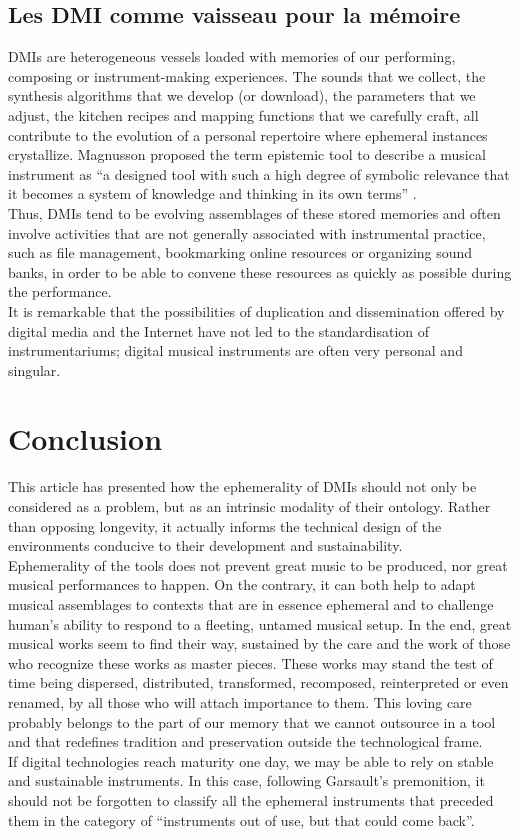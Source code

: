 \subsection{Les DMI comme vaisseau pour la mémoire}
DMIs are heterogeneous vessels loaded with memories of our performing, composing or instrument-making experiences. The sounds that we collect, the synthesis algorithms that we develop (or download), the parameters that we adjust, the kitchen recipes and mapping functions that we carefully craft, all contribute to the evolution of a personal repertoire where ephemeral instances crystallize. Magnusson proposed the term epistemic tool to describe a musical instrument as “a designed tool with such a high degree of symbolic relevance that it becomes a system of knowledge and thinking in its own terms” \cite{magnusson_epistemic_2009}.\\
\indent Thus, DMIs tend to be evolving assemblages of these stored memories and often involve activities that are not generally associated with instrumental practice, such as file management, bookmarking online resources or organizing sound banks, in order to be able to convene these resources as quickly as possible during the performance.\\
\indent It is remarkable that the possibilities of duplication and dissemination offered by digital media and the Internet have not led to the standardisation of instrumentariums; digital musical instruments are often very personal and singular.

\section{Conclusion}
This article has presented how the ephemerality of DMIs should not only be considered as a problem, but as an intrinsic modality of their ontology. Rather than opposing longevity, it actually informs the technical design of the environments conducive to their development and sustainability.\\
\indent Ephemerality of the tools does not prevent great music to be produced, nor great musical performances to happen. On the contrary, it can both help to adapt musical assemblages to contexts that are in essence ephemeral and to challenge human's ability to respond to a fleeting, untamed musical setup. In the end, great musical works seem to find their way, sustained by the care and the work of those who recognize these works as master pieces. These works may stand the test of time being dispersed, distributed, transformed, recomposed, reinterpreted or even renamed, by all those who will attach importance to them. This loving care probably belongs to the part of our memory that we cannot outsource in a tool and that redefines tradition and preservation outside the technological frame.\\
\indent If digital technologies reach maturity one day, we may be able to rely on stable and sustainable instruments. In this case, following Garsault's premonition, it should not be forgotten to classify all the ephemeral instruments that preceded them in the category of “instruments out of use, but that could come back”.